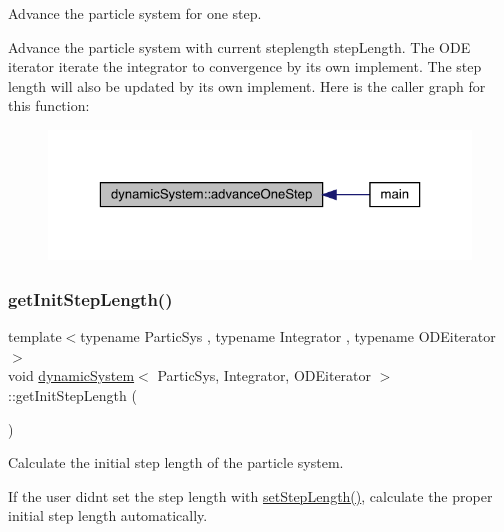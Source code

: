 Advance the particle system for one step. 

Advance the particle system with current steplength step\+Length. The O\+DE iterator iterate the integrator to convergence by its own implement. The step length will also be updated by its own implement. Here is the caller graph for this function\+:\nopagebreak
\begin{figure}[H]
\begin{center}
\leavevmode
\includegraphics[width=323pt]{classdynamic_system_a3b6569e359c6451a038107455903c6a1_icgraph}
\end{center}
\end{figure}
\mbox{\label{classdynamic_system_a9009d61ca09844f016ebc0d87467dba3}} 
\subsubsection{\texorpdfstring{get\+Init\+Step\+Length()}{getInitStepLength()}}
{\footnotesize\ttfamily template$<$typename Partic\+Sys , typename Integrator , typename O\+D\+Eiterator $>$ \\
void \mbox{\hyperlink{classdynamic_system}{dynamic\+System}}$<$ Partic\+Sys, Integrator, O\+D\+Eiterator $>$\+::get\+Init\+Step\+Length (\begin{DoxyParamCaption}{ }\end{DoxyParamCaption})\hspace{0.3cm}{\ttfamily [private]}}



Calculate the initial step length of the particle system. 

If the user didn\textquotesingle{}t set the step length with \mbox{\hyperlink{classdynamic_system_af1b1ccfa965c677bd66029b42377117d}{set\+Step\+Length()}}, calculate the proper initial step length automatically. \mbox{\label{classdynamic_system_a44849a58489dd8c300edc920f793c56a}} 
